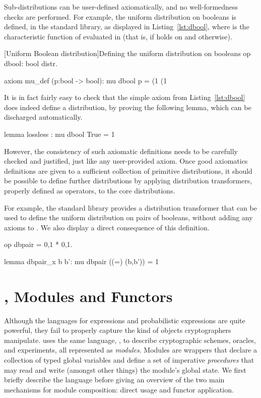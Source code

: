 Sub-distributions can be user-defined axiomatically, and no well-formedness
checks are performed. For example, the uniform distribution on booleans is
defined, in the standard library, as displayed in Listing~\ref{lst:dbool}, where
 is the characteristic function of  evaluated in
 (that is,  if  holds on  and
 otherwise).

\begin{easycrypt}[label={lst:dbool}]{[Uniform Boolean distribution]Defining the uniform distribution on booleans}
op dbool: bool distr.

axiom mu_def (p:bool -> bool):
  mu dbool p =
    (1%
    (1%
\end{easycrypt}

It is in fact fairly easy to check that the simple axiom from
Listing~\ref{lst:dbool} does indeed define a distribution, by proving the
following lemma, which can be discharged automatically.

\begin{easycrypt}[]{}
lemma lossless : mu dbool True = 1%
\end{easycrypt}

However, the consistency of such axiomatic definitions needs to be carefully
checked and justified, just like any user-provided axiom. Once good axiomatics
definitions are given to a sufficient collection of primitive distributions, it
should be possible to define further distributions by applying distribution
transformers, properly defined as operators, to the core distributions.

For example, the standard library  provides a distribution transformer
 that can be used to define
the uniform distribution on pairs of booleans, without adding any axioms to
\EasyCrypt. We also display a direct consequence of this definition.

\begin{easycrypt}[]{}
op dbpair = {0,1} * {0,1}.

lemma dbpair_x b b': mu dbpair ((=) (b,b')) = 1%
\end{easycrypt}

\section{\pWHILE, Modules and Functors\label{sec:modules}}
Although the languages for expressions and probabilistic expressions are quite
powerful, they fail to properly capture the kind of objects cryptographers
manipulate. \EasyCrypt uses the same language, \pWHILE, to describe
cryptographic schemes, oracles, and experiments, all represented as
\emph{modules}.
Modules are wrappers that declare a collection of typed global variables and
define a set of imperative \emph{procedures} that may read and write
(amongst other things) the module's global state. We first briefly describe the
\pWHILE language before giving an overview of the two main mechanisms for
module composition: direct usage and functor application.

